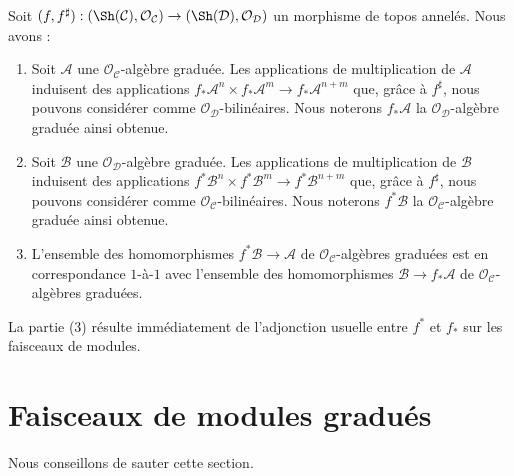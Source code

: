 \begin{remark}
\label{remark-functoriality-ga}
Soit $(f, f^\sharp) : (\Sh(\mathcal{C}), \mathcal{O}_\mathcal{C})
\to (\Sh(\mathcal{D}), \mathcal{O}_\mathcal{D})$
un morphisme de topos annelés. Nous avons :
\begin{enumerate}
\item Soit $\mathcal{A}$ une $\mathcal{O}_\mathcal{C}$-algèbre graduée.
Les applications de multiplication de $\mathcal{A}$ induisent des applications
$f_*\mathcal{A}^n \times f_*\mathcal{A}^m \to f_*\mathcal{A}^{n + m}$
que, grâce à $f^\sharp$, nous pouvons considérer comme
$\mathcal{O}_\mathcal{D}$-bilinéaires. Nous noterons $f_*\mathcal{A}$ la
$\mathcal{O}_\mathcal{D}$-algèbre graduée ainsi obtenue.
\item Soit $\mathcal{B}$ une $\mathcal{O}_\mathcal{D}$-algèbre graduée.
Les applications de multiplication de $\mathcal{B}$ induisent des applications
$f^*\mathcal{B}^n \times f^*\mathcal{B}^m \to f^*\mathcal{B}^{n + m}$
que, grâce à $f^\sharp$, nous pouvons considérer comme
$\mathcal{O}_\mathcal{C}$-bilinéaires. Nous noterons $f^*\mathcal{B}$ la
$\mathcal{O}_\mathcal{C}$-algèbre graduée ainsi obtenue.
\item L'ensemble des homomorphismes $f^*\mathcal{B} \to \mathcal{A}$
de $\mathcal{O}_\mathcal{C}$-algèbres graduées est en correspondance
$1$-à-$1$ avec l'ensemble
des homomorphismes $\mathcal{B} \to f_*\mathcal{A}$ de
$\mathcal{O}_\mathcal{C}$-algèbres graduées.
\end{enumerate}
La partie (3) résulte immédiatement de l'adjonction usuelle entre $f^*$ et
$f_*$ sur les faisceaux de modules.
\end{remark}




\section{Faisceaux de modules gradués}
\label{section-graded-modules}

\noindent
Nous conseillons de sauter cette section.

